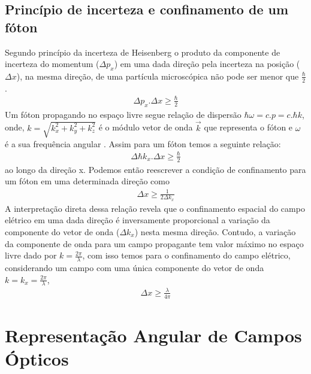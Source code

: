\subsection{Princípio de incerteza e confinamento de um fóton}
Segundo princípio da incerteza de Heisenberg o produto da componente de incerteza do momentum ($\Delta p_x$) em uma dada direção pela incerteza na posição ($\Delta x$), na mesma direção, de uma partícula microscópica não pode ser menor que $\frac{\hbar}{2}$.
\begin{eqnarray}
\Delta p_x.\Delta x \geq \frac{\hbar}{2}
\end{eqnarray}
Um fóton propagando no espaço livre segue relação de dispersão $\hbar \omega=c.p=c.\hbar k$, onde, $k=\sqrt{k_x^2+k_y^2+k_z^2}$ é o módulo vetor de onda $\vec{k}$ que representa o fóton e $\omega$ é a sua frequência angular \cite{principle}. Assim para um fóton temos a seguinte relação:
\begin{eqnarray}
\Delta \hbar k_x.\Delta x \geq \frac{\hbar}{2}
\end{eqnarray}
ao longo da direção x. Podemos então reescrever a condição de confinamento para um fóton em uma determinada direção como
\begin{eqnarray}
\Delta x \geq \frac{1}{2\Delta k_x}
\label{inversa}
\end{eqnarray}
A interpretação direta dessa relação revela que o confinamento espacial do campo elétrico em uma dada direção é inversamente proporcional a variação da componente do vetor de onda ($\Delta k_x$) nesta mesma direção. Contudo, a variação da componente de onda para um campo propagante tem valor máximo no espaço livre dado por $k=\frac{2\pi}{\lambda}$, com isso temos para o confinamento do campo elétrico, considerando um campo com uma única componente do vetor de onda $k=k_x=\frac{2\pi}{\lambda}$,
\begin{eqnarray}
\Delta x \geq \frac{\lambda}{4\pi}
\label{difracao}
\end{eqnarray}

\section{Representação Angular de Campos Ópticos}
\label{angular}
